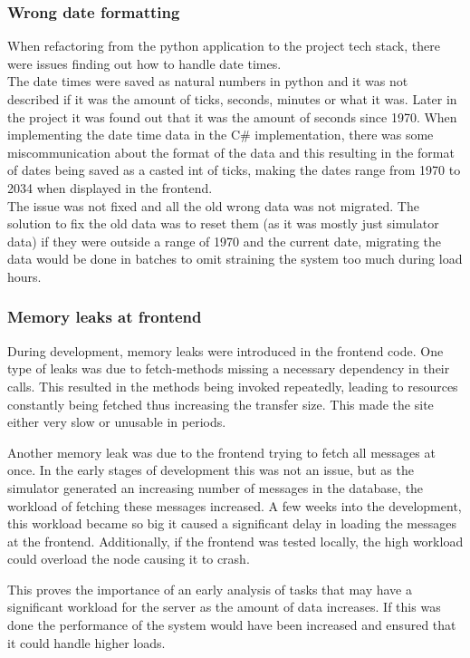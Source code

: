 \subsubsection{Wrong date formatting}

When refactoring from the python application to the project tech stack, there were issues finding out how to handle date times.\\

The date times were saved as natural numbers in python and it was not described if it was the amount of ticks, seconds, minutes or what it was. Later in the project it was found out that it was the amount of seconds since 1970. When implementing the date time data in the C\# implementation, there was some miscommunication about the format of the data and this resulting in the format of dates being saved as a casted int of ticks, making the dates range from 1970 to 2034 when displayed in the frontend. \\

The issue was not fixed and all the old wrong data was not migrated. The solution to fix the old data was to reset them (as it was mostly just simulator data) if they were outside a range of 1970 and the current date, migrating the data would be done in batches to omit straining the system too much during load hours.

\subsubsection{Memory leaks at frontend}

During development, memory leaks were introduced in the frontend code. One type of leaks was due to fetch-methods missing a necessary dependency in their calls. This resulted in the methods being invoked repeatedly, leading to resources constantly being fetched thus increasing the transfer size. This made the site either very slow or unusable in periods.

Another memory leak was due to the frontend trying to fetch all messages at once. In the early stages of development this was not an issue, but as the simulator generated an increasing number of messages in the database, the workload of fetching these messages increased. A few weeks into the development, this workload became so big it caused a significant delay in loading the messages at the frontend. Additionally, if the frontend was tested locally, the high workload could overload the node causing it to crash.

This proves the importance of an early analysis of tasks that may have a significant workload for the server as the amount of data increases. If this was done the performance of the system would have been increased and ensured that it could handle higher loads.